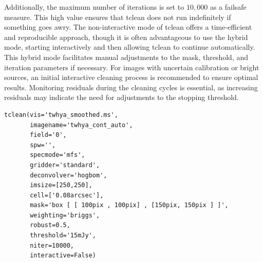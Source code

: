 Additionally, the maximum number of iterations is set to $10,000$ as a failsafe measure. This high value ensures that tclean does not run indefinitely if something goes awry. The non-interactive mode of tclean offers a time-efficient and reproducible approach, though it is often advantageous to use the hybrid mode, starting interactively and then allowing tclean to continue automatically. This hybrid mode facilitates manual adjustments to the mask, threshold, and iteration parameters if necessary. For images with uncertain calibration or bright sources, an initial interactive cleaning process is recommended to ensure optimal results. Monitoring residuals during the cleaning cycles is essential, as increasing residuals may indicate the need for adjustments to the stopping threshold.

\vspace{15mm}

\begin{lstlisting}[style=casa-python]
tclean(vis='twhya_smoothed.ms',
       imagename='twhya_cont_auto',
       field='0',
       spw='',
       specmode='mfs',
       gridder='standard',
       deconvolver='hogbom',
       imsize=[250,250],
       cell=['0.08arcsec'],
       mask='box [ [ 100pix , 100pix] , [150pix, 150pix ] ]',
       weighting='briggs',
       robust=0.5,
       threshold='15mJy',
       niter=10000,
       interactive=False)
\end{lstlisting}